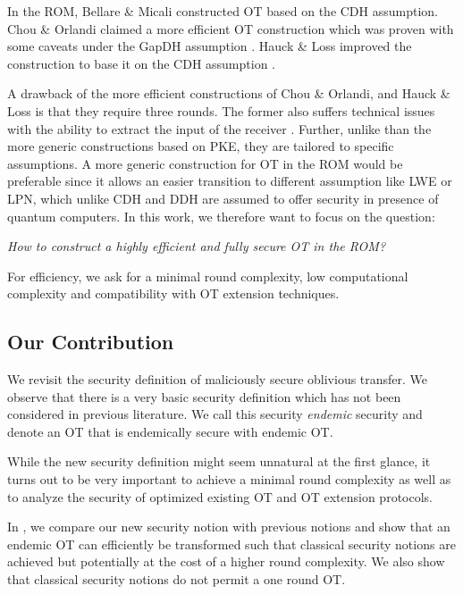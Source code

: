 In the ROM, Bellare \& Micali \cite{C:BelMic89} constructed OT based on the CDH assumption. Chou \& Orlandi \cite{LC:ChoOrl15} claimed a more efficient OT construction which was proven with some caveats under the GapDH assumption \cite{cryptoeprint:2017:1011}. Hauck \& Loss improved the construction to base it on the CDH assumption \cite{cryptoeprint:2017:1011}.

A drawback of the more efficient constructions of Chou \& Orlandi, and Hauck \& Loss is that they require three rounds. The former also suffers technical issues with the ability to extract the input of the receiver \cite{LC:ChoOrl15}. Further, unlike than the more generic constructions based on PKE, they are tailored to specific assumptions. A more generic construction for OT in the ROM would be preferable since it allows an easier transition to different assumption like LWE or LPN, which unlike CDH and DDH are assumed to offer security in presence of quantum computers. In this work, we therefore want to focus on the question:

\begin{center}
\emph{How to construct a highly efficient and fully secure OT in the ROM?}
\end{center}

For efficiency, we ask for a minimal round complexity, low computational complexity and compatibility with OT extension techniques.

\subsection{Our Contribution}

We revisit the security definition of maliciously secure oblivious transfer. We observe that there is a very basic security definition which has not been considered in previous literature. We call this security \emph{endemic} security and denote an OT that is endemically secure with endemic OT. 

While the new security definition might seem unnatural at the first glance, it turns out to be very important to achieve a minimal round complexity as well as to analyze the security of optimized existing OT and OT extension protocols.

In , we compare our new security notion with previous notions and show that an endemic OT can efficiently  be transformed such that classical security notions are achieved but potentially at the cost of a higher round complexity. We also show that classical security notions do not permit a one round OT.

